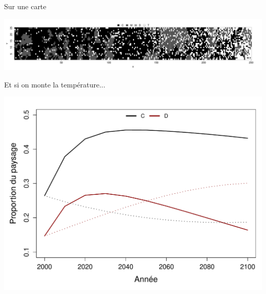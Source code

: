 \documentclass{eecslides}
\begin{document}
%
%

	\begin{frame}{Sur une carte}
		\begin{center}
			\includegraphics[height=0.25\textheight]{largeplot}
		\end{center}
	\end{frame}



	\begin{frame}{Et si on monte la température...}
		\begin{center}
			\includegraphics[height=0.6\textheight]{CC_MF}
		\end{center}
	\end{frame}
\end{document}
